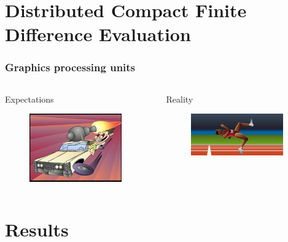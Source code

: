 \documentclass[10pt]{beamer}
\begin{document}
\section{Distributed Compact Finite Difference Evaluation}
\begin{frame}
\frametitle{Graphics processing units}
\begin{columns}[c]
     \begin{column}[T]{5cm}
        Expectations
        \begin{figure}
        \includegraphics[width=150px]{img/expectations.jpg}
        \end{figure}
    \end{column}

    \begin{column}[T]{5cm}
        Reality
        \begin{figure}
        \includegraphics[width=150px]{img/reality.png}
        \end{figure}
    \end{column}
\end{columns}
\end{frame}

\section{Results}
\end{document}
